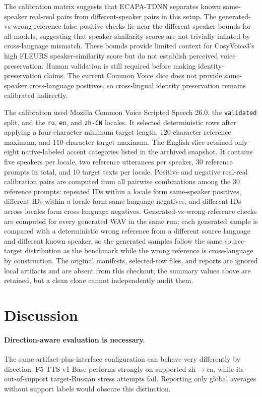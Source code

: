 \documentclass[11pt]{article}
\begin{document}
The calibration matrix suggests that ECAPA-TDNN separates known same-speaker real-real pairs from different-speaker pairs in this setup. The generated-vs-wrong-reference false-positive checks lie near the different-speaker bounds for all models, suggesting that speaker-similarity scores are not trivially inflated by cross-language mismatch. These bounds provide limited context for CosyVoice3's high FLEURS speaker-similarity score but do not establish perceived voice preservation. Human validation is still required before making identity-preservation claims. The current Common Voice slice does not provide same-speaker cross-language positives, so cross-lingual identity preservation remains calibrated indirectly.

The calibration used Mozilla Common Voice Scripted Speech 26.0, the \texttt{validated} split, and the \texttt{ru}, \texttt{en}, and \texttt{zh-CN} locales. It selected deterministic rows after applying a four-character minimum target length, 120-character reference maximum, and 110-character target maximum. The English slice retained only eight native-labeled accent categories listed in the archived snapshot. It contains five speakers per locale, two reference utterances per speaker, 30 reference prompts in total, and 10 target texts per locale. Positive and negative real-real calibration pairs are computed from all pairwise combinations among the 30 reference prompts: repeated IDs within a locale form same-speaker positives, different IDs within a locale form same-language negatives, and different IDs across locales form cross-language negatives. Generated-vs-wrong-reference checks are computed for every generated WAV in the same run; each generated sample is compared with a deterministic wrong reference from a different source language and different known speaker, so the generated samples follow the same source-target distribution as the benchmark while the wrong reference is cross-language by construction. The original  manifests, selected-row files, and reports are ignored local artifacts and are absent from this checkout; the summary values above are retained, but a clean clone cannot independently audit them.

\FloatBarrier

\section{Discussion}

\paragraph{Direction-aware evaluation is necessary.}
The same artifact-plus-interface configuration can behave very differently by direction. F5-TTS v1 Base performs strongly on supported zh$\rightarrow$en, while its out-of-support target-Russian stress attempts fail. Reporting only global averages without support labels would obscure this distinction.
\end{document}
